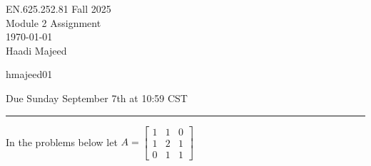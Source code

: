 \documentclass[12pt,letterpaper, onecolumn]{exam}
\begin{document}
\begingroup  
    \centering
    \LARGE EN.625.252.81 Fall 2025\\
    \LARGE Module 2 Assignment\\[0.5em]
    \large \today\\[0.5em]
    \large Haadi Majeed\par
    \large hmajeed01\par
    \large Due Sunday September 7th at 10:59 CST\par
\endgroup
\rule{\textwidth}{0.4pt}
\printanswers
\renewcommand{\solutiontitle}{\noindent\textbf{Ans:}\enspace}

\begin{center}
    In the problems below let
    $A = \begin{bmatrix}
    1 & 1 & 0 \\
    1 & 2 & 1 \\
    0 & 1 & 1
    \end{bmatrix}$
\end{center}
\end{document}
